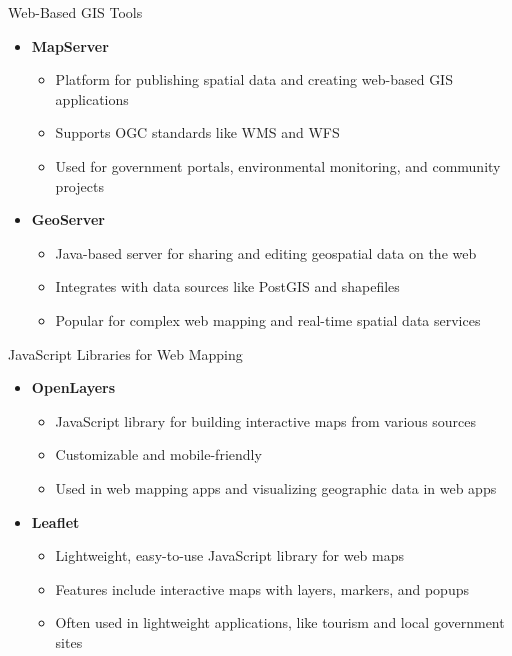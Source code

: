 \documentclass{beamer}
\begin{document}
        \begin{frame}{Web-Based GIS Tools}
            \begin{itemize}
                \item \textbf{MapServer}
                    \begin{itemize}
                        \item Platform for publishing spatial data and creating web-based GIS applications
                        \item Supports OGC standards like WMS and WFS
                        \item Used for government portals, environmental monitoring, and community projects
                    \end{itemize}

                \item \textbf{GeoServer}
                    \begin{itemize}
                        \item Java-based server for sharing and editing geospatial data on the web
                        \item Integrates with data sources like PostGIS and shapefiles
                        \item Popular for complex web mapping and real-time spatial data services
                    \end{itemize}
            \end{itemize}
        \end{frame}

        \begin{frame}{JavaScript Libraries for Web Mapping}
            \begin{itemize}
                \item \textbf{OpenLayers}
                    \begin{itemize}
                        \item JavaScript library for building interactive maps from various sources
                        \item Customizable and mobile-friendly
                        \item Used in web mapping apps and visualizing geographic data in web apps
                    \end{itemize}

                \item \textbf{Leaflet}
                    \begin{itemize}
                        \item Lightweight, easy-to-use JavaScript library for web maps
                        \item Features include interactive maps with layers, markers, and popups
                        \item Often used in lightweight applications, like tourism and local government sites
                    \end{itemize}
            \end{itemize}
        \end{frame}
\end{document}
